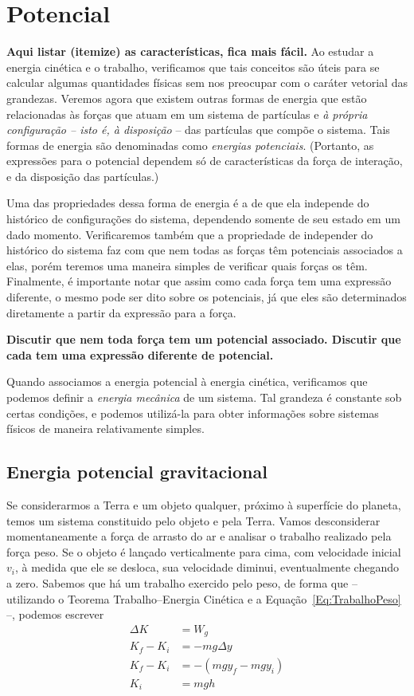 \section{Potencial}

\textbf{Aqui listar (itemize) as características, fica mais fácil.}
Ao estudar a energia cinética e o trabalho, verificamos que tais conceitos são úteis para se calcular algumas quantidades físicas sem nos preocupar com o caráter vetorial das grandezas. Veremos agora que existem outras formas de energia que estão relacionadas às forças que atuam em um sistema de partículas e \emph{à própria configuração -- isto é, à disposição} -- das partículas que compõe o sistema. Tais formas de energia são denominadas como \emph{energias potenciais}. (Portanto, as expressões para o potencial dependem só de características da força de interação, e da disposição das partículas.)

Uma das propriedades dessa forma de energia é a de que ela independe do histórico de configurações do sistema, dependendo somente de seu estado em um dado momento. Verificaremos também que a propriedade de independer do histórico do sistema faz com que nem todas as forças têm potenciais associados a elas, porém teremos uma maneira simples de verificar quais forças os têm. Finalmente, é importante notar que assim como cada força tem uma expressão diferente, o mesmo pode ser dito sobre os potenciais, já que eles são determinados diretamente a partir da expressão para a força.

\textbf{Discutir que nem toda força tem um potencial associado. Discutir que cada tem uma expressão diferente de potencial.}

Quando associamos a energia potencial à energia cinética, verificamos que podemos definir a \emph{energia mecânica} de um sistema. Tal grandeza é constante sob certas condições, e podemos utilizá-la para obter informações sobre sistemas físicos de maneira relativamente simples.

\subsection{Energia potencial gravitacional}

Se considerarmos a Terra e um objeto qualquer, próximo à superfície do planeta, temos um sistema constituido pelo objeto e pela Terra. Vamos desconsiderar momentaneamente a força de arrasto do ar e analisar o trabalho realizado pela força peso. Se o objeto é lançado verticalmente para cima, com velocidade inicial $v_i$, à medida que ele se desloca, sua velocidade diminui, eventualmente chegando a zero. Sabemos que há um trabalho exercido pelo peso, de forma que -- utilizando o Teorema Trabalho--Energia Cinética e a Equação~\ref{Eq:TrabalhoPeso} --, podemos escrever
\begin{align}
  \Delta K &= W_g \\
  K_f - K_i &=  -mg\Delta y \\
  K_f - K_i &=  -(mgy_f - mgy_i) \\
  K_i &= mgh
\end{align}

